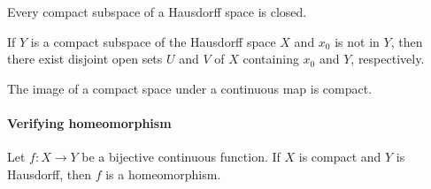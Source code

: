 \begin{theorem}
  Every compact subspace of a Hausdorff space is closed.
\end{theorem}

\begin{lemma}
  If \( Y \) is a compact subspace of the Hausdorff space \( X \) and \( x_0 \) is not in \( Y \), then there exist disjoint open sets \( U \) and \( V \) of \( X \) containing \( x_0 \) and \( Y \), respectively.
\end{lemma}

\begin{theorem}
  The image of a compact space under a continuous map is compact.
\end{theorem}

\paragraph{Verifying homeomorphism}

\begin{theorem}
  Let \( f: X \to Y \) be a bijective continuous function.
  If \( X \) is compact and \( Y \) is Hausdorff, then \( f \) is a homeomorphism.
\end{theorem}

